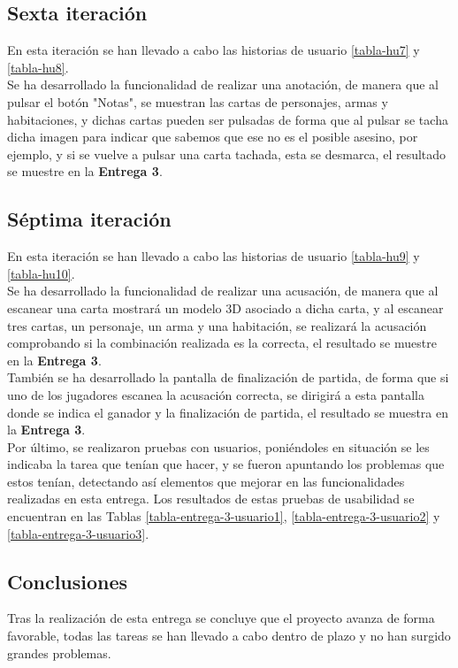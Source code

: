 \subsection{Sexta iteración}
En esta iteración se han llevado a cabo las historias de usuario \ref{tabla-hu7} y \ref{tabla-hu8}.\\

Se ha desarrollado la funcionalidad de realizar una anotación, de manera que al pulsar el botón "Notas", se muestran las cartas de personajes, armas y habitaciones, y dichas cartas pueden ser pulsadas de forma que al pulsar se tacha dicha imagen para indicar que sabemos que ese no es el posible asesino, por ejemplo, y si se vuelve a pulsar una carta tachada, esta se desmarca, el resultado se muestre en la \textbf{Entrega 3}.\\

\subsection{Séptima iteración}
En esta iteración se han llevado a cabo las historias de usuario \ref{tabla-hu9} y \ref{tabla-hu10}.\\

Se ha desarrollado la funcionalidad de realizar una acusación, de manera que al escanear una carta mostrará un modelo 3D asociado a dicha carta, y al escanear tres cartas, un personaje, un arma y una habitación, se realizará la acusación comprobando si la combinación realizada es la correcta, el resultado se muestre en la \textbf{Entrega 3}.\\

También se ha desarrollado la pantalla de finalización de partida, de forma que si uno de los jugadores escanea la acusación correcta, se dirigirá a esta pantalla donde se indica el ganador y la finalización de partida, el resultado se muestra en la \textbf{Entrega 3}.\\

Por último, se realizaron pruebas con usuarios, poniéndoles en situación se les indicaba la tarea que tenían que hacer, y se fueron apuntando los problemas que estos tenían, detectando así elementos que mejorar en las funcionalidades realizadas en esta entrega. Los resultados de estas pruebas de usabilidad se encuentran en las Tablas \ref{tabla-entrega-3-usuario1}, \ref{tabla-entrega-3-usuario2} y \ref{tabla-entrega-3-usuario3}.


\subsection{Conclusiones}
Tras la realización de esta entrega se concluye que el proyecto avanza de forma favorable, todas las tareas se han llevado a cabo dentro de plazo y no han surgido grandes problemas.\\

